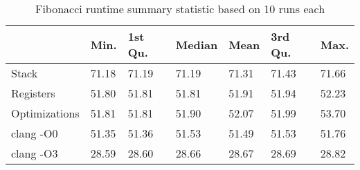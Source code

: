 \begin{table}[h!]
\centering
\begin{tabular}{p{}p{}p{}p{}p{}p{}p{}}
  \hline
 & Min. & 1st Qu. & Median & Mean & 3rd Qu. & Max. \\ 
  \hline
Stack & 71.18 & 71.19 & 71.19 & 71.31 & 71.43 & 71.66 \\ 
  Registers & 51.80 & 51.81 & 51.81 & 51.91 & 51.94 & 52.23 \\ 
  Optimizations & 51.81 & 51.81 & 51.90 & 52.07 & 51.99 & 53.70 \\ 
  clang -O0 & 51.35 & 51.36 & 51.53 & 51.49 & 51.53 & 51.76 \\ 
  clang -O3 & 28.59 & 28.60 & 28.66 & 28.67 & 28.69 & 28.82 \\ 
   \hline
\end{tabular}
\caption{Fibonacci runtime summary statistic based on 10 runs each}
\end{table}
